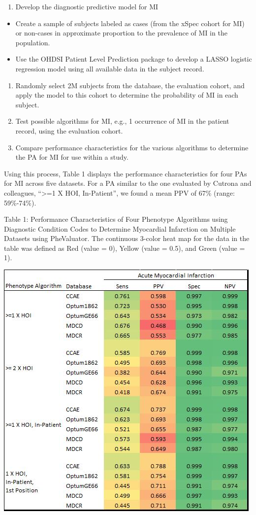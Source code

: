 \documentclass[11pt]{book}
\providecommand{\tightlist}{%
  \setlength{\itemsep}{0pt}\setlength{\parskip}{0pt}}
\theoremstyle{definition}
\theoremstyle{definition}
\theoremstyle{definition}
\theoremstyle{remark}
\begin{document}
\begin{enumerate}
\def\labelenumi{\arabic{enumi})}
\setcounter{enumi}{1}
\tightlist
\item
  Develop the diagnostic predictive model for MI
\end{enumerate}

\begin{itemize}
\item
  Create a sample of subjects labeled as cases (from the xSpec cohort for MI) or non-cases in approximate proportion to the prevalence of MI in the population.
\item
  Use the OHDSI Patient Level Prediction package to develop a LASSO logistic regression model using all available data in the subject record.
\end{itemize}

\begin{enumerate}
\def\labelenumi{\arabic{enumi})}
\setcounter{enumi}{2}
\item
  Randomly select 2M subjects from the database, the evaluation cohort, and apply the model to this cohort to determine the probability of MI in each subject.
\item
  Test possible algorithms for MI, e.g., 1 occurrence of MI in the patient record, using the evaluation cohort.
\item
  Compare performance characteristics for the various algorithms to determine the PA for MI for use within a study.
\end{enumerate}

Using this process, Table 1 displays the performance characteristics for four PAs for MI across five datasets. For a PA similar to the one evaluated by Cutrona and colleagues, ``\textgreater=1 X HOI, In-Patient'', we found a mean PPV of 67\% (range: 59\%-74\%).

Table 1: Performance Characteristics of Four Phenotype Algorithms using Diagnostic Condition Codes to Determine Myocardial Infarction on Multiple Datasets using PheValuator. The continuous 3-color heat map for the data in the table was defined as Red (value = 0), Yellow (value = 0.5), and Green (value = 1).

\begin{center}\includegraphics[width=0.75\linewidth]{images/ClinicalValidity/figure6} \end{center}
\end{document}
